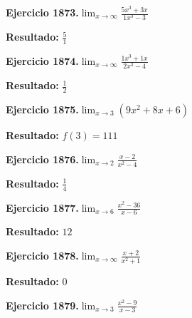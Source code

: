 \documentclass[10pt,a4paper]{article}
\begin{document}
\newpage
\begin{ejbox}
\textbf{Ejercicio 1873.}\quad $\lim_{x\to \infty} \frac{5x^3 + 3x}{1x^3 - 3}$
\end{ejbox}

\begin{solbox}
\textbf{Resultado:} \(\displaystyle \frac{5}{1}\)
\end{solbox}

\begin{ejbox}
\textbf{Ejercicio 1874.}\quad $\lim_{x\to \infty} \frac{1x^3 + 1x}{2x^3 - 4}$
\end{ejbox}

\begin{solbox}
\textbf{Resultado:} \(\displaystyle \frac{1}{2}\)
\end{solbox}

\begin{ejbox}
\textbf{Ejercicio 1875.}\quad $\lim_{x\to 3} (9x^2 +8x +6)$
\end{ejbox}

\begin{solbox}
\textbf{Resultado:} \(\displaystyle f(3) = 111\)
\end{solbox}

\newpage
\begin{ejbox}
\textbf{Ejercicio 1876.}\quad $\lim_{x\to 2} \frac{x-2}{x^2-4}$
\end{ejbox}

\begin{solbox}
\textbf{Resultado:} \(\displaystyle \frac{1}{4}\)
\end{solbox}

\begin{ejbox}
\textbf{Ejercicio 1877.}\quad $\lim_{x\to 6} \frac{x^2-36}{x-6}$
\end{ejbox}

\begin{solbox}
\textbf{Resultado:} \(\displaystyle 12\)
\end{solbox}

\begin{ejbox}
\textbf{Ejercicio 1878.}\quad $\lim_{x\to \infty} \frac{x + 2}{x^2 + 1}$
\end{ejbox}

\begin{solbox}
\textbf{Resultado:} \(\displaystyle 0\)
\end{solbox}

\newpage
\begin{ejbox}
\textbf{Ejercicio 1879.}\quad $\lim_{x\to 3} \frac{x^2-9}{x-3}$
\end{ejbox}
\end{document}
